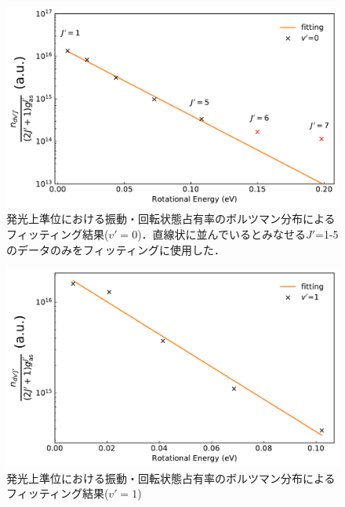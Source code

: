 \begin{figure}
    \centering
    \includegraphics[width=15cm]{pictures/upper-fitting-0.pdf}
    \caption[発光上準位における振動・回転状態占有率のボルツマン分布によるフィッティング結果($v'=0$)]{発光上準位における振動・回転状態占有率のボルツマン分布によるフィッティング結果($v'=0$)．直線状に並んでいるとみなせる$J'$=1-5のデータのみをフィッティングに使用した．}
    \label{fig:upper-fitting-0}
\end{figure}

\begin{figure}
    \centering
    \includegraphics[width=15cm]{pictures/upper-fitting-1.pdf}
    \caption{発光上準位における振動・回転状態占有率のボルツマン分布によるフィッティング結果($v'=1$)}
    \label{fig:upper-fitting-1}
\end{figure}

